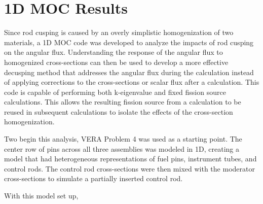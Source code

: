 \section{1D MOC Results}

Since rod cusping is caused by an overly simplistic homogenization of two materials, a 1D MOC code was developed to analyze the impacts of rod cusping on the angular flux.  Understanding the response of the angular flux to homogenized cross-sections can then be used to develop a more effective decusping method that addresses the angular flux during the calculation instead of applying corrections to the cross-sections or scalar flux after a calculation.  This code is capable of performing both k-eigenvalue and fixed fission source calculations.  This allows the resulting fission source from a calculation to be reused in subsequent calculations to isolate the effects of the cross-section homogenization.

Two begin this analysis, VERA Problem 4 was used as a starting point.  The center row of pins across all three assemblies was modeled in 1D, creating a model that had heterogeneous representations of fuel pins, instrument tubes, and control rods.  The control rod cross-sections were then mixed with the moderator cross-sections to simulate a partially inserted control rod.  

With this model set up, 